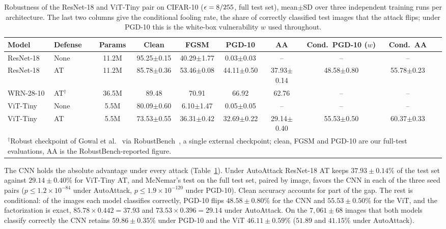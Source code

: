 \begin{table}[!t]
\centering
\caption{Robustness of the ResNet-18 and ViT-Tiny pair on CIFAR-10 ($\epsilon = 8/255$, full test set), mean$\pm$SD over three independent training runs per architecture. The last two columns give the conditional fooling rate, the share of correctly classified test images that the attack flips; under PGD-10 this is the white-box vulnerability $w$ used throughout.}
\label{tab:main_results}
\scriptsize
\setlength{\tabcolsep}{3pt}
\begin{tabular}{llcccccccc}
\toprule
\textbf{Model} & \textbf{Defense} & \textbf{Params} & \textbf{Clean} & \textbf{FGSM} & \textbf{PGD-10} & \textbf{AA} & \textbf{Cond.\ PGD-10 ($w$)} & \textbf{Cond.\ AA} \\
\midrule
ResNet-18 & None & 11.2M & 95.25$\pm$0.15 & 40.29$\pm$1.77 & 0.03$\pm$0.03 & -- & -- & -- \\
ResNet-18 & AT & 11.2M & 85.78$\pm$0.36 & 53.46$\pm$0.08 & 44.11$\pm$0.50 & 37.93$\pm$0.14 & 48.58$\pm$0.80 & 55.78$\pm$0.23 \\
WRN-28-10 & AT$^\dagger$ & 36.5M & 89.48 & 70.91 & 66.92 & 62.76 & -- & -- \\
ViT-Tiny & None & 5.5M & 80.09$\pm$0.60 & 6.10$\pm$1.47 & 0.05$\pm$0.05 & -- & -- & -- \\
ViT-Tiny & AT & 5.5M & 73.53$\pm$0.55 & 36.31$\pm$0.42 & 32.69$\pm$0.22 & 29.14$\pm$0.40 & 55.53$\pm$0.50 & 60.37$\pm$0.33 \\
\bottomrule
\multicolumn{9}{p{0.96\textwidth}}{\scriptsize $^\dagger$Robust checkpoint of Gowal et al.~\cite{gowal2020uncovering} via RobustBench~\cite{croce2021robustbench}, a single external checkpoint; clean, FGSM and PGD-10 are our full-test evaluations, AA is the RobustBench-reported figure.}
\end{tabular}
\end{table}

The CNN holds the absolute advantage under every attack (Table~\ref{tab:main_results}). Under AutoAttack ResNet-18 AT keeps $37.93\pm0.14\%$ of the test set against $29.14\pm0.40\%$ for ViT-Tiny AT, and McNemar's test on the full test set, paired by image, favors the CNN in each of the three seed pairs ($p \leq 1.2\times10^{-84}$ under AutoAttack, $p \leq 1.9\times10^{-120}$ under PGD-10). Clean accuracy accounts for part of the gap. The rest is conditional: of the images each model classifies correctly, PGD-10 flips $48.58\pm0.80\%$ for the CNN and $55.53\pm0.50\%$ for the ViT, and the factorization is exact, $85.78\times0.442 = 37.93$ and $73.53\times0.396 = 29.14$ under AutoAttack. On the $7{,}061\pm68$ images that both models classify correctly the CNN retains $59.86\pm0.35\%$ under PGD-10 and the ViT $46.11\pm0.59\%$ ($51.89$ and $41.15\%$ under AutoAttack).

